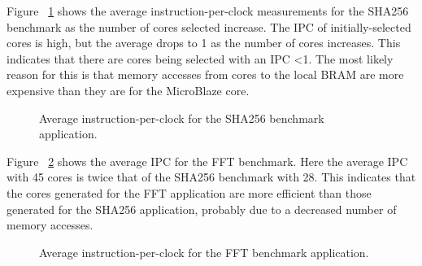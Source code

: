 \documentclass{UoYCSproject}
\begin{document}
Figure ~\ref{fig:ipcSHA256} shows the average instruction-per-clock measurements for the SHA256 benchmark as
the number of cores selected increase. The IPC of initially-selected cores
is high, but the average drops to 1 as the number of cores increases. This indicates that
there are cores being selected with an IPC <1. The most likely reason for this is that
memory accesses from cores to the local BRAM are more expensive than they are for the
MicroBlaze core.

\begin{figure}[H]
\caption{Average instruction-per-clock for the SHA256 benchmark application.}
\label{fig:ipcSHA256}
\end{figure}

Figure ~\ref{fig:ipcFFT} shows the average IPC for the FFT benchmark.
Here the average IPC with 45 cores is twice that of the SHA256 benchmark with 28.
This indicates that the cores generated for the FFT application are more efficient
than those generated for the SHA256 application, probably due to a decreased number of memory
accesses.

\begin{figure}[H]
\caption{Average instruction-per-clock for the FFT benchmark application.}
\label{fig:ipcFFT}
\end{figure}
\end{document}

